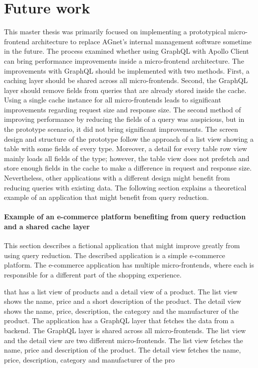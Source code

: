 \chapter{Future work}\label{chapter:future-work}

This master thesis was primarily focused on implementing a prototypical micro-frontend architecture to replace AGnet's internal management software sometime in the future. The process examined whether using GraphQL with Apollo Client can bring performance improvements inside a micro-frontend architecture. The improvements with GraphQL should be implemented with two methods. First, a caching layer should be shared across all micro-frontends. Second, the GraphQL layer should remove fields from queries that are already stored inside the cache. Using a single cache instance for all micro-frontends leads to significant improvements regarding request size and response size. The second method of improving performance by reducing the fields of a query was auspicious, but in the prototype scenario, it did not bring significant improvements. The screen design and structure of the prototype follow the approach of a list view showing a table with some fields of every type. Moreover, a detail for every table row view mainly loads all fields of the type; however, the table view does not prefetch and store enough fields in the cache to make a difference in request and response size. Nevertheless, other applications with a different design might benefit from reducing queries with existing data. The following section explains a theoretical example of an application that might benefit from query reduction.

\subsubsection{Example of an e-commerce platform benefiting from query reduction and a shared cache layer}

This section describes a fictional application that might improve greatly from using query reduction. The described application is a simple e-commerce platform. The e-commerce application has multiple micro-frontends, where each is responsible for a different part of the shopping experience. 

that has a list view of products and a detail view of a product. The list view shows the name, price and a short description of the product. The detail view shows the name, price, description, the category and the manufacturer of the product. The application has a GraphQL layer that fetches the data from a backend. The GraphQL layer is shared across all micro-frontends. The list view and the detail view are two different micro-frontends. The list view fetches the name, price and description of the product. The detail view fetches the name, price, description, category and manufacturer of the pro

